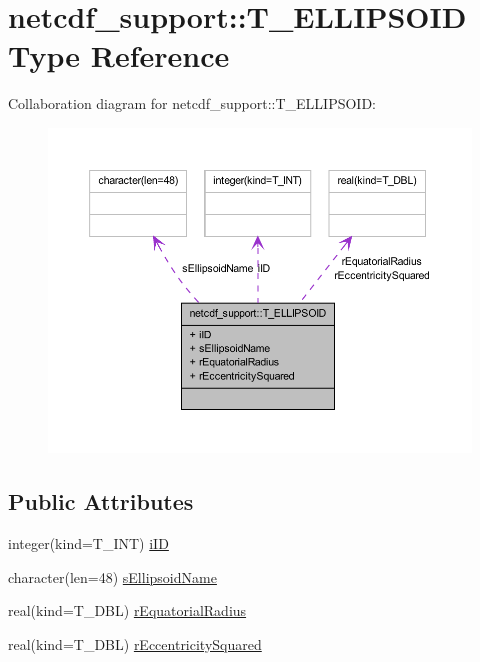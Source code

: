 \hypertarget{typenetcdf__support_1_1_t___e_l_l_i_p_s_o_i_d}{
\section{netcdf\_\-support::T\_\-ELLIPSOID Type Reference}
\label{typenetcdf__support_1_1_t___e_l_l_i_p_s_o_i_d}
}


Collaboration diagram for netcdf\_\-support::T\_\-ELLIPSOID:\nopagebreak
\begin{figure}[H]
\begin{center}
\leavevmode
\includegraphics[width=400pt]{typenetcdf__support_1_1_t___e_l_l_i_p_s_o_i_d__coll__graph}
\end{center}
\end{figure}
\subsection*{Public Attributes}
\begin{DoxyCompactItemize}
\item 
integer(kind=T\_\-INT) \hyperlink{typenetcdf__support_1_1_t___e_l_l_i_p_s_o_i_d_a3433d789f59bd139a185ae29313ed2c8}{iID}
\item 
character(len=48) \hyperlink{typenetcdf__support_1_1_t___e_l_l_i_p_s_o_i_d_a22343dc73ba3b01e26c2a3c4a7693697}{sEllipsoidName}
\item 
real(kind=T\_\-DBL) \hyperlink{typenetcdf__support_1_1_t___e_l_l_i_p_s_o_i_d_a4e944cbfb135d13cdca903e043f25a80}{rEquatorialRadius}
\item 
real(kind=T\_\-DBL) \hyperlink{typenetcdf__support_1_1_t___e_l_l_i_p_s_o_i_d_a8d9f2954b922781f09393b869f7b80d3}{rEccentricitySquared}
\end{DoxyCompactItemize}


